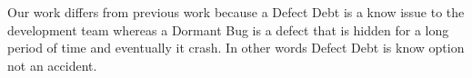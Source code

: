 Our work differs from previous work because a Defect Debt is a know issue to the development team whereas a Dormant Bug is a defect that is hidden for a long period of time and eventually it crash. In other words Defect Debt is know option not an accident.